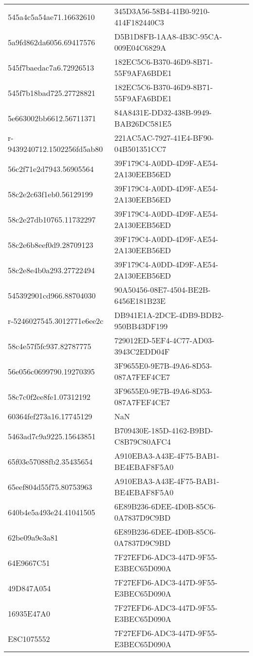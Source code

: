 \begin{tabular}{ll}
545a4c5a54ae71.16632610 & 345D3A56-58B4-41B0-9210-414F182440C3 \\
5a9fd862da6056.69417576 & D5B1D8FB-1AA8-4B3C-95CA-009E04C6829A \\
545f7baedac7a6.72926513 & 182EC5C6-B370-46D9-8B71-55F9AFA6BDE1 \\
545f7b18bad725.27728821 & 182EC5C6-B370-46D9-8B71-55F9AFA6BDE1 \\
5e663002bb6612.56711371 & 84A8431E-DD32-438B-9949-BAB26DC581E5 \\
r-9439240712.1502256fd5ab80 & 221AC5AC-7927-41E4-BF90-04B501351CC7 \\
56c2f71e2d7943.56905564 & 39F179C4-A0DD-4D9F-AE54-2A130EEB56ED \\
58c2e2c63f1eb0.56129199 & 39F179C4-A0DD-4D9F-AE54-2A130EEB56ED \\
58c2e27db10765.11732297 & 39F179C4-A0DD-4D9F-AE54-2A130EEB56ED \\
58c2e6b8eef0d9.28709123 & 39F179C4-A0DD-4D9F-AE54-2A130EEB56ED \\
58c2e8e4b0a293.27722494 & 39F179C4-A0DD-4D9F-AE54-2A130EEB56ED \\
545392901cd966.88704030 & 90A50456-08E7-4504-BE2B-6456E181B23E \\
r-5246027545.3012771e6ee2c & DB941E1A-2DCE-4DB9-BDB2-950BB43DF199 \\
58c4e57f5fc937.82787775 & 729012ED-5EF4-4C77-AD03-3943C2EDD04F \\
56e056c0699790.19270395 & 3F9655E0-9E7B-49A6-8D53-087A7FEF4CE7 \\
58c7c0f2ee8fe1.07312192 & 3F9655E0-9E7B-49A6-8D53-087A7FEF4CE7 \\
60364fef273a16.17745129 & NaN \\
5463ad7c9a9225.15643851 & B709430E-185D-4162-B9BD-C8B79C80AFC4 \\
65f03e57088fb2.35435654 & A910EBA3-A43E-4F75-BAB1-BE4EBAF8F5A0 \\
65eef804d55f75.80753963 & A910EBA3-A43E-4F75-BAB1-BE4EBAF8F5A0 \\
640b4e5a493e24.41041505 & 6E89B236-6DEE-4D0B-85C6-0A7837D9C9BD \\
62be09a9e3a81 & 6E89B236-6DEE-4D0B-85C6-0A7837D9C9BD \\
64E9667C51 & 7F27EFD6-ADC3-447D-9F55-E3BEC65D090A \\
49D847A054 & 7F27EFD6-ADC3-447D-9F55-E3BEC65D090A \\
16935E47A0 & 7F27EFD6-ADC3-447D-9F55-E3BEC65D090A \\
E8C1075552 & 7F27EFD6-ADC3-447D-9F55-E3BEC65D090A \\

\end{tabular}
